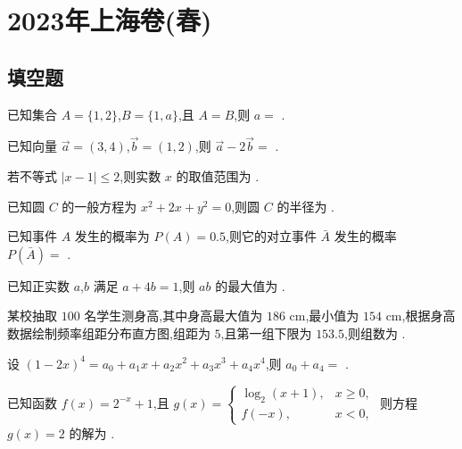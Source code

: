 \chapter{2023年上海卷(春)}

\section{填空题}

\begin{problem}
已知集合 \(A=\{1,2\}\),\(B=\{1,a\}\),且 \(A=B\),则 \(a=\)\fillinblank{} .
\end{problem}

\begin{problem}
已知向量 \(\overrightarrow{a}=(3,4)\),\(\overrightarrow{b}=(1,2)\),则 \(\overrightarrow{a}-2\overrightarrow{b}=\)\fillinblank{} .
\end{problem}

\begin{problem}
若不等式 \(\left|x-1\right|\le 2\),则实数 \(x\) 的取值范围为\fillinblank{} .
\end{problem}

\begin{problem}
已知圆 \(C\) 的一般方程为 \(x^2+2x+y^2=0\),则圆 \(C\) 的半径为\fillinblank{} .
\end{problem}

\begin{problem}
已知事件 \(A\) 发生的概率为 \(P(A)=0.5\),则它的对立事件 \(\bar{A}\) 发生的概率 \(P(\bar{A})=\)\fillinblank{} .
\end{problem}

\begin{problem}
已知正实数 \(a\),\(b\) 满足 \(a+4b=1\),则 \(ab\) 的最大值为\fillinblank{} .
\end{problem}

\begin{problem}
某校抽取 \(100\) 名学生测身高,其中身高最大值为 \(186\) cm,最小值为 \(154\) cm,根据身高数据绘制频率组距分布直方图,组距为 \(5\),且第一组下限为 \(153.5\),则组数为\fillinblank{} .
\end{problem}

\begin{problem}
设 \(\left(1-2x\right)^4=a_0+a_1x+a_2x^2+a_3x^3+a_4x^4\),则 \(a_0+a_4=\)\fillinblank{} .
\end{problem}

\begin{problem}
已知函数 \(f(x)=2^{-x}+1\),且 \(g(x)= \begin{cases}
\log_2(x+1),  &x\ge 0,\\
f(-x),  &x<0,
\end{cases}\)
则方程 \(g(x)=2\) 的解为\fillinblank{} .
\end{problem}


